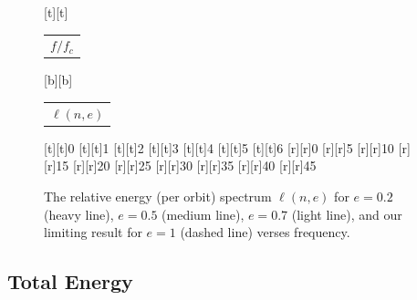 \documentclass[aps,prd,amsfonts,amssymb,amsmath,nofootinbib,floatfix,reprint,showpacs,groupedaddress]{revtex4-1}
\begin{document}
\begin{figure}
\begin{psfrags}%
\psfragscanon%
%
[t][t]{\color[rgb]{0,0,0}\setlength{\tabcolsep}{0pt}\begin{tabular}{c}{\Large$f/f_{c}$}\end{tabular}}%
[b][b]{\color[rgb]{0,0,0}\setlength{\tabcolsep}{0pt}\begin{tabular}{c}{\Large$\ell(n,e)$}\end{tabular}}%
%
[t][t]{0}%
[t][t]{1}%
[t][t]{2}%
[t][t]{3}%
[t][t]{4}%
[t][t]{5}%
[t][t]{6}%
%
[r][r]{0}%
[r][r]{5}%
[r][r]{10}%
[r][r]{15}%
[r][r]{20}%
[r][r]{25}%
[r][r]{30}%
[r][r]{35}%
[r][r]{40}%
[r][r]{45}%
%
%
\end{psfrags}%
\caption{The relative energy (per orbit) spectrum $\ell(n,e)$ for $e = 0.2$ (heavy line), $e = 0.5$ (medium line), $e = 0.7$ (light line), and our limiting result for $e = 1$ (dashed line) verses frequency.\label{fig:ell}}
\end{figure}

\subsection{Total Energy}
\end{document}
